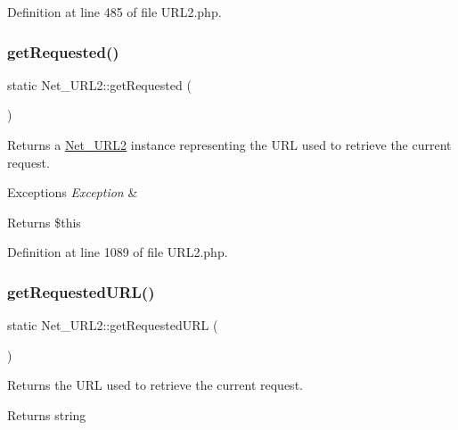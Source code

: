 Definition at line 485 of file U\+R\+L2.\+php.

\hypertarget{classNet__URL2_a57c171f9507f78aafbaba695f1220273}{}\label{classNet__URL2_a57c171f9507f78aafbaba695f1220273} 
\subsubsection{\texorpdfstring{get\+Requested()}{getRequested()}}
{\footnotesize\ttfamily static Net\+\_\+\+U\+R\+L2\+::get\+Requested (\begin{DoxyParamCaption}{ }\end{DoxyParamCaption})\hspace{0.3cm}{\ttfamily [static]}}

Returns a \hyperlink{classNet__URL2}{Net\+\_\+\+U\+R\+L2} instance representing the U\+RL used to retrieve the current request.


\begin{DoxyExceptions}{Exceptions}
{\em Exception} & \\
\hline
\end{DoxyExceptions}
\begin{DoxyReturn}{Returns}
\$this 
\end{DoxyReturn}


Definition at line 1089 of file U\+R\+L2.\+php.

\hypertarget{classNet__URL2_acc74a73bb075b3a500ded81b63799d59}{}\label{classNet__URL2_acc74a73bb075b3a500ded81b63799d59} 
\subsubsection{\texorpdfstring{get\+Requested\+U\+R\+L()}{getRequestedURL()}}
{\footnotesize\ttfamily static Net\+\_\+\+U\+R\+L2\+::get\+Requested\+U\+RL (\begin{DoxyParamCaption}{ }\end{DoxyParamCaption})\hspace{0.3cm}{\ttfamily [static]}}

Returns the U\+RL used to retrieve the current request.

\begin{DoxyReturn}{Returns}
string 
\end{DoxyReturn}


